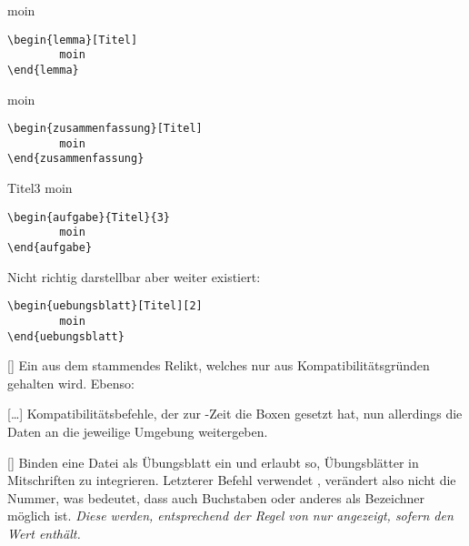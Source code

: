 \begingroup\begin{lemma}[Titel]
moin
\begin{lstlisting}[language=lLatex]
\begin{lemma}[Titel]
        moin
\end{lemma}\end{lstlisting}
\end{lemma}\endgroup

\begingroup\begin{zusammenfassung}[Titel]
moin
\begin{lstlisting}[language=lLatex]
\begin{zusammenfassung}[Titel]
        moin
\end{zusammenfassung}\end{lstlisting}
\end{zusammenfassung}\endgroup

\begingroup\begin{aufgabe}{Titel}{3}
moin
\begin{lstlisting}[language=lLatex]
\begin{aufgabe}{Titel}{3}
        moin
\end{aufgabe}\end{lstlisting}
\end{aufgabe}\endgroup

Nicht richtig darstellbar aber weiter existiert:
\begin{lstlisting}[language=lLatex]
\begin{uebungsblatt}[Titel][2]
        moin
\end{uebungsblatt}\end{lstlisting}
\fi
{}[\cmdold]
Ein aus dem  stammendes Relikt, welches nur aus Kompatibilitätsgründen gehalten wird. Ebenso:

[\cmdlist {}\cmdlist \ldots\cmdold]
Kompatibilitätsbefehle, der zur -Zeit die Boxen gesetzt hat, nun allerdings die Daten an die jeweilige Umgebung weitergeben.

[\cmdlist {}]
Binden eine Datei als Übungsblatt ein und erlaubt so, Übungsblätter in Mitschriften zu integrieren. Letzterer Befehl verwendet , verändert also nicht die Nummer, was bedeutet, dass auch Buchstaben oder anderes als Bezeichner möglich ist. \emph{Diese werden, entsprechend der Regel von  nur angezeigt, sofern  den Wert \T{\true} enthält.}


